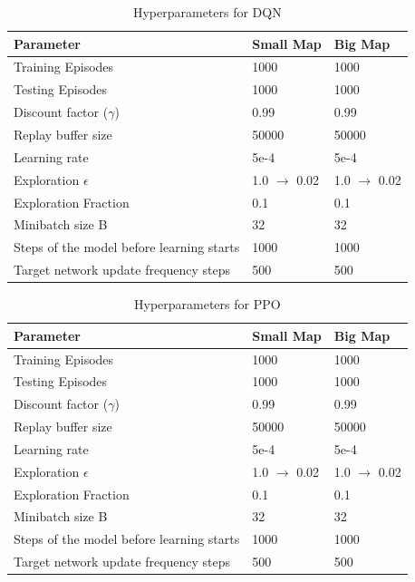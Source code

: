 \documentclass[12pt]{report}
\begin{document}
\begin{table} [!h]
\begin{center}
 \begin{tabular}{l | l | l} 
 \hline
 Parameter & Small Map & Big Map  \\ [0.5ex] 
 \hline\hline
 Training Episodes & 1000 & 1000\\
 Testing Episodes & 1000 & 1000\\
 Discount factor ($\gamma$) & 0.99 & 0.99 \\ 
 Replay buffer size & 50000 & 50000\\
 Learning rate & 5e-4 & 5e-4\\
 Exploration $\epsilon$ & 1.0 $\rightarrow$ 0.02 & 1.0 $\rightarrow$ 0.02\\ 
 Exploration Fraction & 0.1 & 0.1\\
 Minibatch size B & 32 & 32\\
 Steps of the model before learning starts & 1000 & 1000\\
 Target network update frequency steps & 500 & 500\\
 \hline
\end{tabular}
\caption{Hyperparameters for DQN}
\label{table:x}
\end{center}
\end{table}

\begin{table} [!h]
\begin{center}
 \begin{tabular}{l | l | l} 
 \hline
 Parameter & Small Map & Big Map  \\ [0.5ex] 
 \hline\hline
 Training Episodes & 1000 & 1000\\
 Testing Episodes & 1000 & 1000\\
 Discount factor ($\gamma$) & 0.99 & 0.99 \\ 
 Replay buffer size & 50000 & 50000\\
 Learning rate & 5e-4 & 5e-4\\
 Exploration $\epsilon$ & 1.0 $\rightarrow$ 0.02 & 1.0 $\rightarrow$ 0.02\\ 
 Exploration Fraction & 0.1 & 0.1\\
 Minibatch size B & 32 & 32\\
 Steps of the model before learning starts & 1000 & 1000\\
 Target network update frequency steps & 500 & 500\\
 \hline
\end{tabular}
\caption{Hyperparameters for PPO}
\label{table:x}
\end{center}
\end{table}
\end{document}
